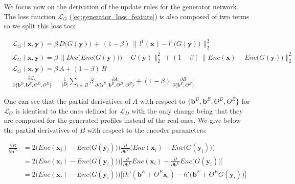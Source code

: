 We focus now on the derivation of the update rules for the generator network. The loss function $\mathcal{L}_{G}$ (\ref{eq:generator_loss_feature}) is also composed of two terms so we split this loss too:

\begin{align*}
    &\mathcal{L}_{G}(\mathbf{x}, \mathbf{y}) = \beta \, D\big(G(\mathbf{y})\big) \,+\, (1-\beta) \,\Big\| \, l^1(\mathbf{x}) - l^1\big(G(\mathbf{y})\big) \,\Big\|^2_{2} \\[5pt]
    & \mathcal{L}_{G}(\mathbf{x}, \mathbf{y})= \beta \, \bigg\|Dec\Big(Enc\big(G(\mathbf{y})\big)\Big) - G(\mathbf{y})\bigg\|^{2}_{2} \, + (1 - \beta) \, \Big\|Enc(\mathbf{x}) - Enc\big(G(\mathbf{y})\big)\Big\|^{2}_{2} \\[5pt]
    & \mathcal{L}_{G}(\mathbf{x}, \mathbf{y}) = \beta \, A + (1 - \beta) \, B \\[10pt]
    & \frac{\partial \mathcal{L}_{G}}{\partial \{ \mathbf{b}^{D}, \mathbf{b}^{E}, \Theta^{D}, \Theta^{E}\}} = \frac{1}{|B|} \sum_{i \in B} \beta \, \frac{\partial A}{\partial \{ \mathbf{b}^{D}, \mathbf{b}^{E}, \Theta^{D}, \Theta^{E}\}} + (1 - \beta) \, \frac{\partial B}{\partial \{ \mathbf{b}^{E}, \Theta^{E} \}}
\end{align*}

\vspace{10pt}

One can see that the partial derivatives of $A$ with respect to $\{ \mathbf{b}^{D}, \mathbf{b}^{E}, \Theta^{D}, \Theta^{E}\}$ for $\mathcal{L}_{G}$ is identical to the ones defined for $\mathcal{L}_{D}$ with the only change being that they are computed for the generated profiles instead of the real ones. We give below the partial derivatives of $B$ with respect to the encoder parameters:

\[
\begin{split}
    \frac{\partial B}{\partial \mathbf{b}^{E}} & = 2\Big(Enc(\mathbf{x}_{i}) - Enc\big(G(\mathbf{y}_{i})\big)\Big) \frac{\partial}{\partial \mathbf{b}^{E}} \Big(Enc(\mathbf{x}_{i}) - Enc\big(G(\mathbf{y}_{i})\big)\Big) \\[5pt]
    & = 2\Big(Enc(\mathbf{x}_{i}) - Enc\big(G(\mathbf{y}_{i})\big)\Big) \Big[\frac{\partial}{\partial \mathbf{b}^{E}} Enc(\mathbf{x}_{i}) - \frac{\partial}{\partial \mathbf{b}^{E}} Enc\big(G(\mathbf{y}_{i})\big)\Big] \\[5pt]
    & = 2\Big(Enc(\mathbf{x}_{i}) - Enc\big(G(\mathbf{y}_{i})\big)\Big) \Big[\big(h'(\mathbf{b}^{E} + \Theta^{E}\mathbf{x}_{i}) - h'\big(\mathbf{b}^{E} + \Theta^{E}G(\mathbf{y}_{i}) \big)\Big]
\end{split}
\]

